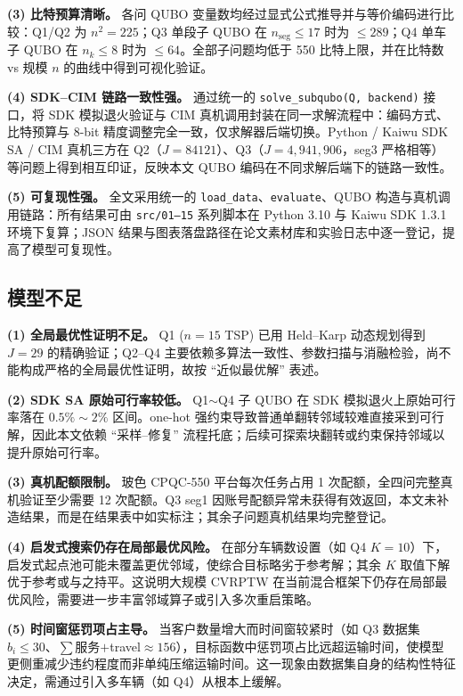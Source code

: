 \documentclass[UTF8,12pt,a4paper]{ctexart}
\begin{document}
\textbf{(3) 比特预算清晰。} 各问 QUBO 变量数均经过显式公式推导并与等价编码进行比较：Q1/Q2 为 $n^2=225$；Q3 单段子 QUBO 在 $n_{\mathrm{seg}}\le 17$ 时为 $\le 289$；Q4 单车子 QUBO 在 $n_k\le 8$ 时为 $\le 64$。全部子问题均低于 550 比特上限，并在比特数 vs 规模 $n$ 的曲线中得到可视化验证。

\textbf{(4) SDK--CIM 链路一致性强。} 通过统一的 \texttt{solve\_subqubo(Q, backend)} 接口，将 SDK 模拟退火验证与 CIM 真机调用封装在同一求解流程中：编码方式、比特预算与 8-bit 精度调整完全一致，仅求解器后端切换。Python / Kaiwu SDK SA / CIM 真机三方在 Q2（$J=84121$）、Q3（$J=4{,}941{,}906$，seg3 严格相等）等问题上得到相互印证，反映本文 QUBO 编码在不同求解后端下的链路一致性。

\textbf{(5) 可复现性强。} 全文采用统一的 \texttt{load\_data}、\texttt{evaluate}、QUBO 构造与真机调用链路：所有结果可由 \texttt{src/01--15} 系列脚本在 Python 3.10 与 Kaiwu SDK 1.3.1 环境下复算；JSON 结果与图表落盘路径在论文素材库和实验日志中逐一登记，提高了模型可复现性。

\subsection{模型不足}

\textbf{(1) 全局最优性证明不足。} Q1 ($n=15$ TSP) 已用 Held--Karp 动态规划得到 $J=29$ 的精确验证；Q2--Q4 主要依赖多算法一致性、参数扫描与消融检验，尚不能构成严格的全局最优性证明，故按 ``近似最优解'' 表述。

\textbf{(2) SDK SA 原始可行率较低。} Q1$\sim$Q4 子 QUBO 在 SDK 模拟退火上原始可行率落在 $0.5\%\sim 2\%$ 区间。one-hot 强约束导致普通单翻转邻域较难直接采到可行解，因此本文依赖 ``采样--修复'' 流程托底；后续可探索块翻转或约束保持邻域以提升原始可行率。

\textbf{(3) 真机配额限制。} 玻色 CPQC-550 平台每次任务占用 1 次配额，全四问完整真机验证至少需要 12 次配额。Q3 seg1 因账号配额异常未获得有效返回，本文未补造结果，而是在结果表中如实标注；其余子问题真机结果均完整登记。

\textbf{(4) 启发式搜索仍存在局部最优风险。} 在部分车辆数设置（如 Q4 $K=10$）下，启发式起点池可能未覆盖更优邻域，使综合目标略劣于参考解；其余 $K$ 取值下解优于参考或与之持平。这说明大规模 CVRPTW 在当前混合框架下仍存在局部最优风险，需要进一步丰富邻域算子或引入多次重启策略。

\textbf{(5) 时间窗惩罚项占主导。} 当客户数量增大而时间窗较紧时（如 Q3 数据集 $b_i\le 30$、$\sum$服务$+$travel$\approx 156$），目标函数中惩罚项占比远超运输时间，使模型更侧重减少违约程度而非单纯压缩运输时间。这一现象由数据集自身的结构性特征决定，需通过引入多车辆（如 Q4）从根本上缓解。
\end{document}
